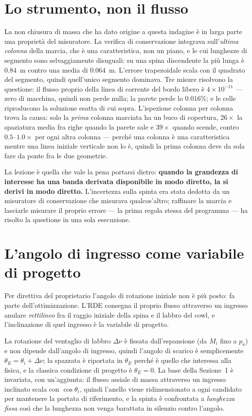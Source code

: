\section{Lo strumento, non il flusso}

La non chiusura di massa che ha dato origine a questa indagine è in
larga parte una proprietà del misuratore. La verifica di
conservazione integrava sull'\emph{ultima colonna} della marcia, che è
una caratteristica, non un piano, e le cui lunghezze di segmento sono
selvaggiamente disuguali: su una spina discendente la più lunga è
$0.84$~m contro una media di $0.064$~m. L'errore trapezoidale scala
con il quadrato del segmento, quindi quell'unico segmento dominava.
Tre misure risolvono la questione: il flusso proprio della linea di
corrente del bordo libero è $4\times10^{-11}$ --- zero di macchina,
quindi non perde nulla; la parete perde lo $0.016\%$; e le celle
riproducono la soluzione esatta di cui sopra. L'ispezione colonna per
colonna trova la causa: solo la \emph{prima} colonna marciata ha un
buco di copertura, $26\times$ la spaziatura media fra righe quando la
parete sale e $39\times$ quando scende, contro $0.5$--$1.0\times$ per
ogni altra colonna --- perché una colonna è una caratteristica mentre
una linea iniziale verticale non lo è, quindi la prima colonna deve
da sola fare da ponte fra le due geometrie.

La lezione è quella che vale la pena portarsi dietro: \textbf{quando
la grandezza di interesse ha una banda derivata disponibile in modo
diretto, la si derivi in modo diretto.} L'incertezza sulla spinta era
stata dedotta da un misuratore di conservazione che misurava
qualcos'altro; raffinare la marcia e lasciarle misurare il proprio
errore --- la prima regola stessa del programma --- ha risolto la
questione in una sola esecuzione.

\section{L'angolo di ingresso come variabile di progetto}
\label{sec:inletangle}

Per direttiva del proprietario l'angolo di rotazione iniziale non è
più posto: fa parte dell'ottimizzazione. L'RDE consegna il proprio
flusso attraverso un ingresso anulare \emph{rettilineo} fra il raggio
iniziale della spina e il labbro del cowl, e l'inclinazione di quel
ingresso è la variabile di progetto.

La rotazione del ventaglio di labbro $\Delta\nu$ è fissata
dall'espansione (da $M_i$ fino a $p_a$) e non dipende dall'angolo di
ingresso, quindi l'angolo di scarico è semplicemente
$\theta_E = \theta_i + \Delta\nu$; la spazzata è riportata in
$\theta_E$ perché è quello che interessa alla fisica, e la classica
condizione di progetto è $\theta_E = 0$. La base della Sezione~1 è
invariata, con un'aggiunta: il flusso assiale di massa attraverso un
ingresso inclinato scala con $\cos\theta_i$, quindi l'anello viene
ridimensionato a ogni candidato per mantenere la portata di
riferimento, e la spinta è confrontata a \emph{lunghezza fissa} così
che la lunghezza non venga barattata in silenzio contro l'angolo.

